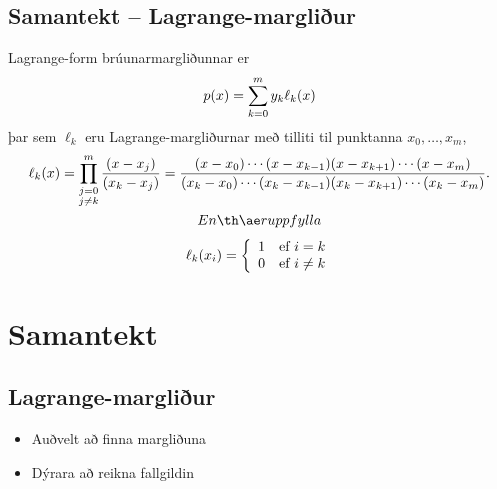 \documentclass[A4paper,10pt,icelandic]{sphinxmanual}
\begin{document}
\subsection{Samantekt – Lagrange-margliður}
\label{kafli03:samantekt-lagrange-margliur}
Lagrange-form brúunarmargliðunnar er
\begin{gather}
\begin{split}p(x)=\sum_{k=0}^m y_k\ell_{k}(x)\end{split}\notag
\end{gather}
þar sem \(\ell_{k}\) eru Lagrange-margliðurnar með tilliti til
punktanna \(x_0,\dots,x_m\),
\begin{gather}
\begin{split}  \ell_{k}(x) = \prod_
      {\substack{j=0\\ j\neq k}}^m\dfrac{(x-x_j)}{(x_k-x_j)}
      = \dfrac{(x-x_0)\cdots(x-x_{k-1})
          (x-x_{k+1})\cdots(x-x_m)}
      {(x_k-x_0)\cdots(x_k-x_{k-1})
          (x_k-x_{k+1})\cdots(x_k-x_m)}.\end{split}\notag\\\begin{split}En þær uppfylla\end{split}\notag
\end{gather}\begin{gather}
\begin{split}\ell_{k}(x_i) = \left\{ \begin{array}{cc}
      1 & \text{ef } i = k \\
      0 & \text{ef } i \not= k
  \end{array} \right.\end{split}\notag
\end{gather}

\section{Samantekt}
\label{kafli03:id3}

\subsection{Lagrange-margliður}
\label{kafli03:lagrange-margliur}\begin{itemize}
\item {} 
Auðvelt að finna margliðuna

\item {} 
Dýrara að reikna fallgildin

\end{itemize}
\end{document}
